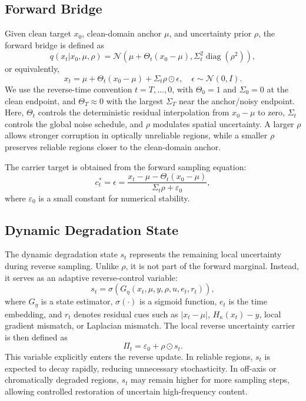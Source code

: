 \documentclass[journal]{IEEEtran}
\newcommand{\N}{\mathcal{N}}
\newcommand{\diag}{\operatorname{diag}}
\newcommand{\hk}{H_{\kappa}}
\newcommand{\eps}{\varepsilon}
\begin{document}
\subsection{Forward Bridge}
Given clean target $x_0$, clean-domain anchor $\mu$, and uncertainty prior $\rho$, the forward bridge is defined as
\begin{equation}
    q(x_t|x_0,\mu,\rho)=\N\left(\mu+\Theta_t(x_0-\mu),\Sigma_t^2\diag(\rho^2)\right),
    \label{eq:forward_bridge}
\end{equation}
or equivalently,
\begin{equation}
    x_t=\mu+\Theta_t(x_0-\mu)+\Sigma_t\rho\odot\epsilon,
    \quad \epsilon\sim\N(0,I).
    \label{eq:forward_sample}
\end{equation}
We use the reverse-time convention $t=T,\ldots,0$, with $\Theta_0=1$ and $\Sigma_0=0$ at the clean endpoint, and $\Theta_T\approx0$ with the largest $\Sigma_T$ near the anchor/noisy endpoint. Here, $\Theta_t$ controls the deterministic residual interpolation from $x_0-\mu$ to zero, $\Sigma_t$ controls the global noise schedule, and $\rho$ modulates spatial uncertainty. A larger $\rho$ allows stronger corruption in optically unreliable regions, while a smaller $\rho$ preserves reliable regions closer to the clean-domain anchor.

The carrier target is obtained from the forward sampling equation:
\begin{equation}
    c_t^{*}=\epsilon=\frac{x_t-\mu-\Theta_t(x_0-\mu)}{\Sigma_t\rho+\eps_0},
    \label{eq:carrier_target}
\end{equation}
where $\eps_0$ is a small constant for numerical stability.

\subsection{Dynamic Degradation State}
The dynamic degradation state $s_t$ represents the remaining local uncertainty during reverse sampling. Unlike $\rho$, it is not part of the forward marginal. Instead, it serves as an adaptive reverse-control variable:
\begin{equation}
    s_t=\sigma\left(G_{\eta}\left(x_t,\mu,y,\rho,u,e_t,r_t\right)\right),
    \label{eq:state}
\end{equation}
where $G_{\eta}$ is a state estimator, $\sigma(\cdot)$ is a sigmoid function, $e_t$ is the time embedding, and $r_t$ denotes residual cues such as $|x_t-\mu|$, $\hk(x_t)-y$, local gradient mismatch, or Laplacian mismatch. The local reverse uncertainty carrier is then defined as
\begin{equation}
    \Pi_t=\eps_0+\rho\odot s_t.
    \label{eq:pi}
\end{equation}
This variable explicitly enters the reverse update. In reliable regions, $s_t$ is expected to decay rapidly, reducing unnecessary stochasticity. In off-axis or chromatically degraded regions, $s_t$ may remain higher for more sampling steps, allowing controlled restoration of uncertain high-frequency content.
\end{document}
